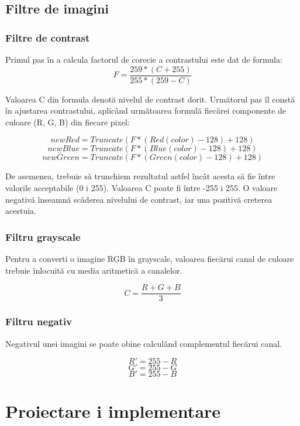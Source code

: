 \documentclass[a4paper,11pt,romanian]{article}
\begin{document}
{\subsection{Filtre de imagini}

\subsubsection{Filtre de contrast} \label{filtrecontrast}
\small{Primul pas \^{i}n a calcula factorul de corecie a contrastului este dat de formula: 
 \[  F =
\frac{259 * (C + 255) }{255 * (259 - C)}
\]

Valoarea C din formula denot\u{a} nivelul de contrast dorit. Urm\u{a}torul pas \^{i}l const\u{a} \^{i}n  ajustarea contrastului, aplic\^{a}nd urm\u{a}toarea formul\u{a} fiec\u{a}rei componente de culoare (R, G, B) din fiecare pixel:

 \[  
newRed = Truncate(F * (Red(color)   - 128) + 128)
\]
 \[  
newBlue = Truncate(F * (Blue(color)   - 128) + 128)
\]
 \[  
newGreen = Truncate(F * (Green(color)   - 128) + 128)
\]

De asemenea, trebuie s\u{a} trunchiem rezultatul astfel \^{i}nc\^{a}t acesta s\u{a} fie \^{i}ntre valorile acceptabile (0 i 255). Valoarea C poate fi \^{i}ntre -255 i 255. O valoare negativ\u{a} \^{i}nseamn\u{a} sc\u{a}derea nivelului de contrast, iar una pozitiv\u{a} creterea acestuia. ~\cite{art:contrast}}

\subsubsection{Filtru grayscale}
Pentru a converti o imagine RGB \^{i}n grayscale, valoarea fiec\u{a}rui canal de culoare trebuie \^{i}nlocuit\u{a} cu media aritmetic\u{a} a canalelor. ~\cite{book:labpi}

\[C = \frac{R + G + B}{3}\]

\subsubsection{Filtru negativ}
Negativul unei imagini se poate obine calcul\^{a}nd complementul fiec\u{a}rui canal. ~\cite{book:labpi}

\[R' = 255 - R\]
\[G' = 255 - G\]
\[B' = 255 - B\]

\section{Proiectare i implementare}

}
\end{document}
